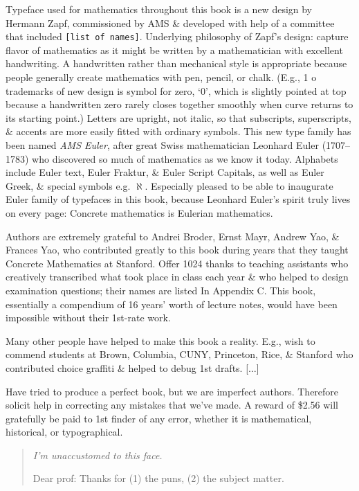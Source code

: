\documentclass{article}
\begin{document}
\begin{enumerate}
	Typeface used for mathematics throughout this book is a new design by {\sc Hermann Zapf}, commissioned by AMS \& developed with help of a committee that included {\tt[list of names]}. Underlying philosophy of {\sc Zapf}'s design: capture flavor of mathematics as it might be written by a mathematician with excellent handwriting. A handwritten rather than mechanical style is appropriate because people generally create mathematics with pen, pencil, or chalk. (E.g., 1 o trademarks of new design is symbol for zero, `0', which is slightly pointed at top because a handwritten zero rarely closes together smoothly when curve returns to its starting point.) Letters are upright, not italic, so that subscripts, superscripts, \& accents are more easily fitted with ordinary symbols. This new type family has been named {\it AMS Euler}, after great Swiss mathematician {\sc Leonhard Euler} (1707--1783) who discovered so much of mathematics as we know it today. Alphabets include Euler text, Euler Fraktur, \& Euler Script Capitals, as well as Euler Greek, \& special symbols e.g. $\aleph$. Especially pleased to be able to inaugurate Euler family of typefaces in this book, because {\sc Leonhard Euler}'s spirit truly lives on every page: Concrete mathematics is Eulerian mathematics.
	
	Authors are extremely grateful to {\sc Andrei Broder, Ernst Mayr, Andrew Yao, \& Frances Yao}, who contributed greatly to this book during years that they taught Concrete Mathematics at Stanford. Offer 1024 thanks to teaching assistants who creatively  transcribed what took place in class each year \& who helped to design examination questions; their names are listed In Appendix C. This book, essentially a compendium of 16 years' worth of lecture notes, would have been impossible without their 1st-rate work.
	
	Many other people have helped to make this book a reality. E.g., wish to commend students at Brown, Columbia, CUNY, Princeton, Rice, \& Stanford who contributed choice graffiti \& helped to debug 1st drafts. [$\ldots$]
	
	Have tried to produce a perfect book, but we are imperfect authors. Therefore solicit help in correcting any mistakes that we've made. A reward of \$2.56 will gratefully be paid to 1st finder of any error, whether it is mathematical, historical, or typographical.
	\begin{quote}\it
		I'm unaccustomed to this face.
		
		Dear prof: Thanks for (1) the puns, (2) the subject matter.
		

\end{quote}
\end{enumerate}
\end{document}
